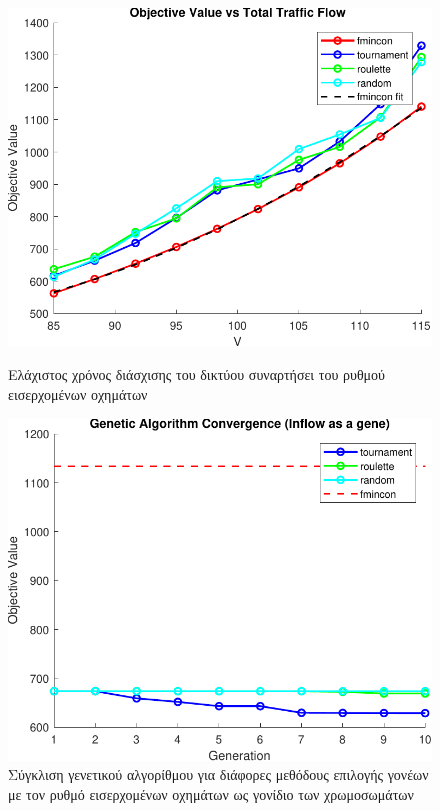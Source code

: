 \documentclass[a4paper,12pt]{article}
\begin{document}
\begin{figure}[h]
    \centering
    \begin{minipage}{0.45\textwidth}
        \centering
        \includegraphics[width=\linewidth]{plot/solutions_for_different_traffic_flows.pdf}
        \caption{Ελάχιστος χρόνος διάσχισης του δικτύου συναρτήσει του ρυθμού εισερχομένων οχημάτων}
        \label{fig:solutions_for_different_traffic_flows}
    \end{minipage}
    \hfill
    \begin{minipage}{0.45\textwidth}
        \centering
        \includegraphics[width=\linewidth]{plot/genetic_convergence_inflow_gene.pdf}
        \caption{Σύγκλιση γενετικού αλγορίθμου για διάφορες μεθόδους επιλογής γονέων με τον ρυθμό εισερχομένων 
        οχημάτων ως γονίδιο των χρωμοσωμάτων}
        \label{fig:/genetic_convergence_inflow_gene}
    \end{minipage}
\end{figure}
\end{document}
